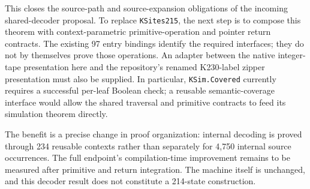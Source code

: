This closes the source-path and source-expansion obligations of the incoming
shared-decoder proposal. To replace \texttt{KSites215}, the next step is to
compose this theorem with context-parametric primitive-operation and pointer
return contracts. The existing 97 entry bindings identify the required
interfaces; they do not by themselves prove those operations. An adapter
between the native integer-tape presentation here and the repository's
renamed K230-label zipper presentation must also be supplied. In particular,
\texttt{KSim.Covered} currently requires a successful per-leaf Boolean check;
a reusable semantic-coverage interface would allow the shared traversal and
primitive contracts to feed its simulation theorem directly.

The benefit is a precise change in proof organization: internal decoding is
proved through 234 reusable contexts rather than separately for 4,750 internal
source occurrences. The full endpoint's compilation-time improvement remains
to be measured after primitive and return integration. The machine itself is
unchanged, and this decoder result does not constitute a 214-state
construction.
